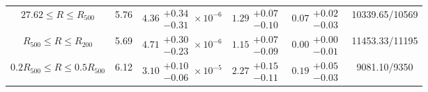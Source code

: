 \documentclass[11pt]{article}
\begin{document}
\begin{table}[htbp]
{\begin{tabular}{@{}cccccc@{}}
   $27.62\leq R\leq R_\mathrm{500}$ & 5.76 &$4.36\substack{+0.34 \\ -0.31}\times 10^{-6}$ &$1
   .29\substack{+0.07 \\-0.10}$ & $0.07\substack{+0.02\\ -0.03}$ & 10339.65/10569 \\ 
   $R_\mathrm{500}\leq R \leq R_\mathrm{200}$& 5.69&$4.71\substack{+0.30\\-0.23}\times 10^{-6}$&$1.15\substack{+0.07\\-0.09}$&$0.00\substack{+0.00\\-0.01}$& 11453.33/11195\\ \midrule
   $0.2R_{\text{500}}\leq R \leq0.5R_{\text{500}}$ & 6.12&$3.10\substack{+0.10 \\ -0.06}\times 10^{-5}$ &$2.27\substack{+0.15 \\-0.11}$ & $0.19\substack{+0.05\\ -0.03}$ & 9081.10/9350  \\
   \bottomrule
   \end{tabular}
}
\end{table}
\end{document}
